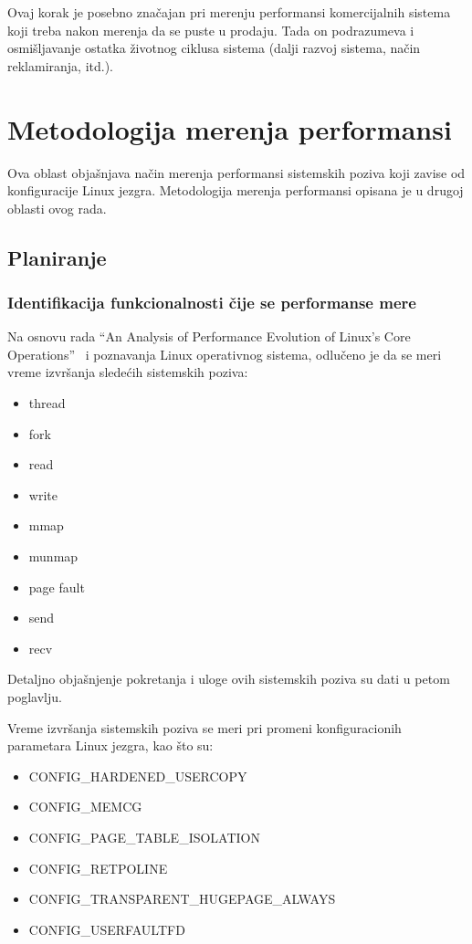 \documentclass[12pt]{report}
\begin{document}
Ovaj korak je posebno značajan pri merenju performansi komercijalnih sistema koji treba nakon merenja da se puste u prodaju. Tada on podrazumeva i osmišljavanje ostatka životnog ciklusa sistema (dalji razvoj sistema, način reklamiranja, itd.).

\chapter{Metodologija merenja performansi}
Ova oblast objašnjava način merenja performansi sistemskih poziva koji zavise od konfiguracije Linux jezgra. Metodologija merenja performansi opisana je u drugoj oblasti ovog rada.

\section{Planiranje}

\subsection{Identifikacija funkcionalnosti čije se performanse mere}\label{identifikacija_funkcionalnosti}
Na osnovu rada ``An Analysis of Performance Evolution of Linux’s Core Operations''~\cite{paper} i poznavanja Linux operativnog sistema, odlučeno je da se meri vreme izvršanja sledećih sistemskih poziva:
\begin{samepage}
    \begin{itemize}
        \item thread
        \item fork
        \item read
        \item write
        \item mmap
        \item munmap
        \item page fault
        \item send
        \item recv
    \end{itemize}
\end{samepage}

Detaljno objašnjenje pokretanja i uloge ovih sistemskih poziva su dati u petom poglavlju.

Vreme izvršanja sistemskih poziva se meri pri promeni konfiguracionih parametara Linux jezgra, kao što su:
\begin{samepage}
    \begin{itemize}
        \item CONFIG\_HARDENED\_USERCOPY
        \item CONFIG\_MEMCG
        \item CONFIG\_PAGE\_TABLE\_ISOLATION
        \item CONFIG\_RETPOLINE
        \item CONFIG\_TRANSPARENT\_HUGEPAGE\_ALWAYS
        \item CONFIG\_USERFAULTFD
    \end{itemize}
\end{samepage}
\end{document}
